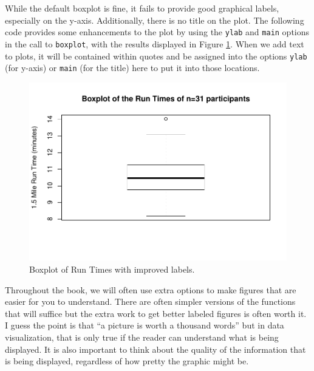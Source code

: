 \documentclass[]{book}
\newenvironment{Shaded}{\begin{snugshade}}{\end{snugshade}}
\newcommand{\KeywordTok}[1]{\textcolor[rgb]{0.13,0.29,0.53}{\textbf{{#1}}}}
\newcommand{\DataTypeTok}[1]{\textcolor[rgb]{0.13,0.29,0.53}{{#1}}}
\newcommand{\StringTok}[1]{\textcolor[rgb]{0.31,0.60,0.02}{{#1}}}
\newcommand{\NormalTok}[1]{{#1}}
\begin{document}
While the default boxplot is fine, it fails to provide good graphical
labels, especially on the y-axis. Additionally, there is no title on the
plot. The following code provides some enhancements to the plot by using
the \texttt{ylab} and \texttt{main} options in the call to
\texttt{boxplot}, with the results displayed in Figure
\ref{fig:Figure9}. When we add text to plots, it will be contained
within quotes and be assigned into the options \texttt{ylab} (for
y-axis) or \texttt{main} (for the title) here to put it into those
locations.



\begin{Shaded}
\end{Shaded}

\begin{figure}[htbp]
\centering
\includegraphics{GreenwoodBanner_files/figure-latex/Figure9-1.pdf}
\caption{\label{fig:Figure9}Boxplot of Run Times with improved labels.}
\end{figure}

Throughout the book, we will often use extra options to make figures
that are easier for you to understand. There are often simpler versions
of the functions that will suffice but the extra work to get better
labeled figures is often worth it. I guess the point is that ``a picture
is worth a thousand words'' but in data visualization, that is only true
if the reader can understand what is being displayed. It is also
important to think about the quality of the information that is being
displayed, regardless of how pretty the graphic might be.
\end{document}
